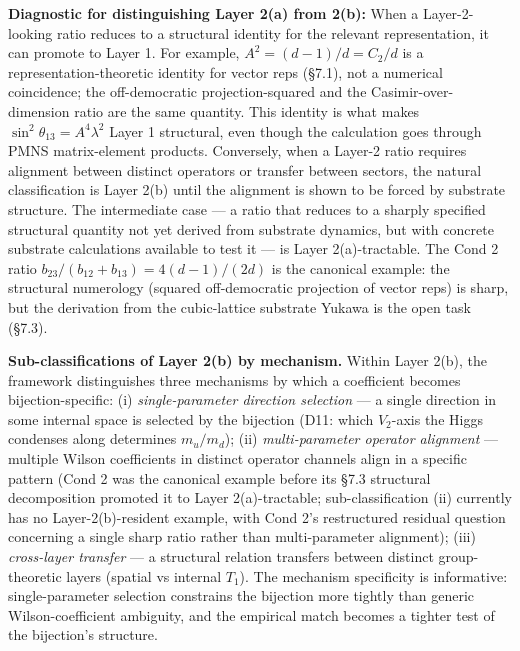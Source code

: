 \documentclass[
]{article}
\begin{document}
\textbf{Diagnostic for distinguishing Layer 2(a) from 2(b):} When a
Layer-2-looking ratio reduces to a structural identity for the relevant
representation, it can promote to Layer 1. For example,
\(A^2 = (d-1)/d = C_2/d\) is a representation-theoretic identity for
vector reps (§7.1), not a numerical coincidence; the off-democratic
projection-squared and the Casimir-over-dimension ratio are the same
quantity. This identity is what makes
\(\sin^2\theta_{13} = A^4\lambda^2\) Layer 1 structural, even though the
calculation goes through PMNS matrix-element products. Conversely, when
a Layer-2 ratio requires alignment between distinct operators or
transfer between sectors, the natural classification is Layer 2(b) until
the alignment is shown to be forced by substrate structure. The
intermediate case --- a ratio that reduces to a sharply specified
structural quantity not yet derived from substrate dynamics, but with
concrete substrate calculations available to test it --- is Layer
2(a)-tractable. The Cond 2 ratio
\(b_{23}/(b_{12}+b_{13}) = 4(d-1)/(2d)\) is the canonical example: the
structural numerology (squared off-democratic projection of vector reps)
is sharp, but the derivation from the cubic-lattice substrate Yukawa is
the open task (§7.3).

\textbf{Sub-classifications of Layer 2(b) by mechanism.} Within Layer
2(b), the framework distinguishes three mechanisms by which a
coefficient becomes bijection-specific: (i) \emph{single-parameter
direction selection} --- a single direction in some internal space is
selected by the bijection (D11: which \(V_2\)-axis the Higgs condenses
along determines \(m_u/m_d\)); (ii) \emph{multi-parameter operator
alignment} --- multiple Wilson coefficients in distinct operator
channels align in a specific pattern (Cond 2 was the canonical example
before its §7.3 structural decomposition promoted it to Layer
2(a)-tractable; sub-classification (ii) currently has no
Layer-2(b)-resident example, with Cond 2's restructured residual
question concerning a single sharp ratio rather than multi-parameter
alignment); (iii) \emph{cross-layer transfer} --- a structural relation
transfers between distinct group-theoretic layers (spatial vs internal
\(T_1\)). The mechanism specificity is informative: single-parameter
selection constrains the bijection more tightly than generic
Wilson-coefficient ambiguity, and the empirical match becomes a tighter
test of the bijection's structure.
\end{document}
